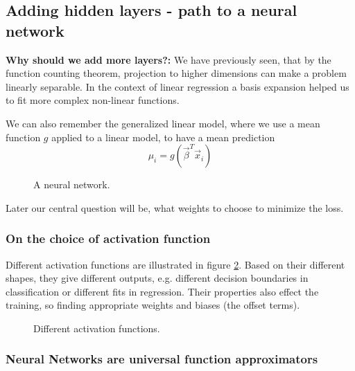 \subsection{Adding hidden layers - path to a neural network}
\textbf{Why should we add more layers?:} We have previously seen, 
that by the function counting theorem,
projection to higher dimensions can make a problem linearly separable.
In the context of linear regression a basis expansion helped us to fit
more complex non-linear functions.

We can also remember the generalized linear model, where we use a 
mean function $g$ applied to a linear model, to have a mean prediction
\begin{equation}
    \mu_i = g(\vec{\beta}^T \vec{x}_i)
\end{equation}


\begin{figure}[!htb]
    \centering
    
    \caption{A neural network.}
    \label{fig:nn_illu}
\end{figure}

Later our central question will be, what weights to choose to minimize the loss.

\subsubsection{On the choice of activation function}
Different activation functions are illustrated in figure \ref{fig:activation_functions}.
Based on their different shapes, they give different outputs, e.g. different
decision boundaries in classification or different fits in regression. Their properties
also effect the training, so finding appropriate weights and biases (the offset terms).

\begin{figure}[!htb]
    \centering
    
    \caption{Different activation functions.}
    \label{fig:activation_functions}
\end{figure}

\subsubsection{Neural Networks are universal function approximators}

